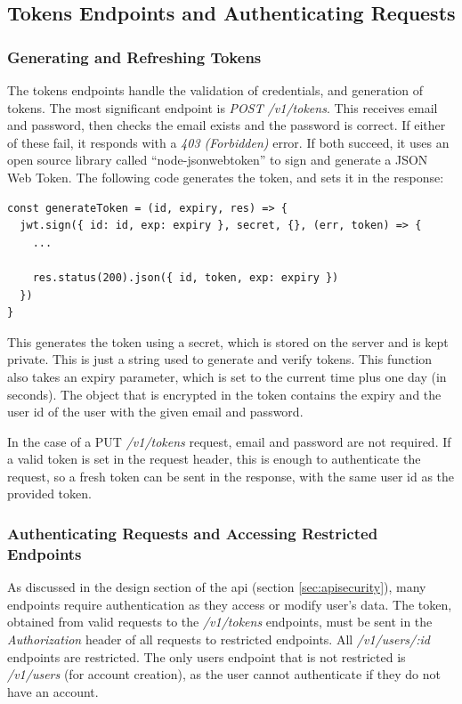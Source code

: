 \documentclass[11pt,openright,a4paper]{report}
\begin{document}
\subsection{Tokens Endpoints and Authenticating Requests}
\subsubsection{Generating and Refreshing Tokens}
The tokens endpoints handle the validation of credentials, and generation of tokens. The most significant endpoint is \emph{POST /v1/tokens}. This receives email and password, then checks the email exists and the password is correct. If either of these fail, it responds with a \emph{403 (Forbidden)} error. If both succeed, it uses an open source library called \enquote{node-jsonwebtoken} \parencite{nodejwt} to sign and generate a JSON Web Token. The following code generates the token, and sets it in the response:
\begin{lstlisting}
const generateToken = (id, expiry, res) => {
  jwt.sign({ id: id, exp: expiry }, secret, {}, (err, token) => {
    ...

    res.status(200).json({ id, token, exp: expiry })
  })
}
\end{lstlisting}

This generates the token using a secret, which is stored on the server and is kept private. This is just a string used to generate and verify tokens. This function also takes an expiry parameter, which is set to the current time plus one day (in seconds). The object that is encrypted in the token contains the expiry and the user id of the user with the given email and password.

In the case of a PUT \emph{/v1/tokens} request, email and password are not required. If a valid token is set in the request header, this is enough to authenticate the request, so a fresh token can be sent in the response, with the same user id as the provided token.

\subsubsection{Authenticating Requests and Accessing Restricted Endpoints}
As discussed in the design section of the api (section \ref{sec:apisecurity}), many endpoints require authentication as they access or modify user's data. The token, obtained from valid requests to the \emph{/v1/tokens} endpoints, must be sent in the \emph{Authorization} header of all requests to restricted endpoints. All \emph{/v1/users/:id} endpoints are restricted. The only users endpoint that is not restricted is \emph{/v1/users} (for account creation), as the user cannot authenticate if they do not have an account.
\end{document}
